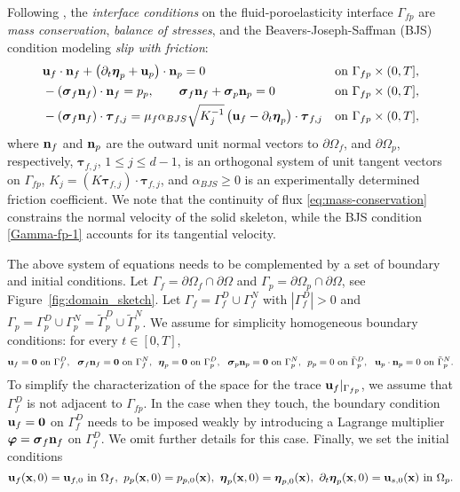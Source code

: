 \documentclass[11pt]{article}
\def\u{{\bf u}}
\def\n{{\bf n}}
\def\btau{\boldsymbol{\tau}}
\def\bbeta{\boldsymbol{\eta}}
\def\bs{\boldsymbol{\sigma}}
\def\bvarphi{\boldsymbol{\varphi}}
\def\d{\partial}
\def\O{\Omega}
\begin{document}
Following \cite{bqq2009,s2005}, the 
{\it interface conditions} on the 
fluid-poroelasticity interface $\Gamma_{fp}$ are {\it mass conservation},
{\it balance of stresses}, and the Beavers-Joseph-Saffman (BJS) condition
\cite{bj1967,s1971} modeling {\it slip with friction}: 
%
\begin{align}
	\label{eq:mass-conservation}
	& \u_f\cdot\n_f + \left({\d_t \bbeta_p} + \u_p\right)\cdot\n_p = 0 
&& \mbox{on } \Gamma_{fp}\times (0,T], 
	\\
        \label{balance-stress}
	& - (\bs_f \n_f)\cdot\n_f =  p_p, \qquad 	\bs_f\n_f + \bs_p\n_p = 0
&& \mbox{on } \Gamma_{fp}\times (0,T],
	\\
	\label{Gamma-fp-1}
	& - (\bs_f\n_f)\cdot\btau_{f,j} = \mu_{f}\alpha_{BJS}\sqrt{K_j^{-1}}
	\left(\u_f - {\d_t \bbeta_p}\right)\cdot\btau_{f,j} 
&& \mbox{on } \Gamma_{fp}\times (0,T],
\end{align}
%
where $\n_f$ and $\n_p$ are the outward unit normal vectors to $\d
\O_f$, and $\d \O_p$, respectively, $\btau_{f,j}$, $1 \le j \le d-1$,
is an orthogonal system of unit tangent vectors on $\Gamma_{fp}$, $K_j
= (K \btau_{f,j}) \cdot \btau_{f,j}$, and $\alpha_{BJS} \ge 0$ is an
experimentally determined friction coefficient.  We note that the
continuity of flux \eqref{eq:mass-conservation} constrains the normal velocity of the solid
skeleton, while the BJS condition \eqref{Gamma-fp-1} accounts for its tangential
velocity.

The above system of equations needs to be complemented by a set of
boundary and initial conditions. Let $\Gamma_f = \partial \O_f \cap \d\Omega$
and $\Gamma_p = \partial \O_p \cap \d\Omega$, see Figure~\ref{fig:domain_sketch}.
Let {$\Gamma_f = \Gamma_f^D \cup \Gamma_f^N$ with $|\Gamma_f^D| > 0$} and $\Gamma_p = \Gamma_p^D \cup \Gamma_p^N = \tilde\Gamma_p^D \cup \tilde\Gamma_p^N$.
We assume for simplicity homogeneous boundary conditions: for every $t \in [0,T]$,
%
$$
{\u_f = \boldsymbol{0} \mbox{ on } \Gamma_f^D, \ \ \bs_f\n_f = \boldsymbol{0} \mbox{ on } \Gamma_f^N,}
{\ \ \bbeta_p = \boldsymbol{0} \mbox{ on } \Gamma_p^D,
\ \ \bs_p\n_p = \boldsymbol{0} \mbox{ on } \Gamma_p^N,}
\ \ p_p = 0 \mbox{ on } \tilde\Gamma_p^D, \ \
\u_p \cdot \n_p = 0 \mbox{ on } \tilde\Gamma_p^N.
$$
%
{To simplify the characterization of the space for the trace $\u_f|_{\Gamma_{fp}}$, we assume that $\Gamma_f^D$ is not adjacent to $\Gamma_{fp}$. In the case when they touch, the boundary condition $\u_f = \boldsymbol{0}$ on $\Gamma_f^D$ needs to be imposed weakly by introducing a Lagrange multiplier $\bvarphi = \bs_f\n_f$ on $\Gamma_f^D$. We omit further details for this case.} Finally, we set the initial conditions
%
\begin{equation}\label{init-cond}
\u_f(\mathbf{x},0) =\u_{f,0} \mbox{ in } \O_f, \,\, 
p_p(\mathbf{x},0) = p_{p,0}(\mathbf{x}), \,\, 
\bbeta_p(\mathbf{x},0) = \bbeta_{p,0}(\mathbf{x}), \,\,  \d_{t}\bbeta_p(\mathbf{x},0) = \u_{s,0} (\mathbf{x})\mbox{ in } \O_p.
\end{equation}
\end{document}
